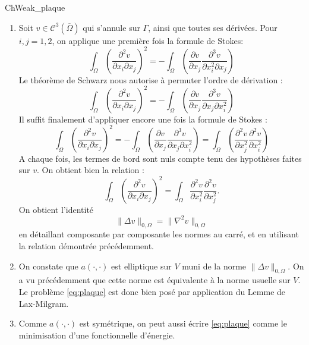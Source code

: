 \begin{corrige}{ChWeak_plaque}
\begin{enumerate}
\item Soit $v \in \mathcal{C}^3(\overline{\Omega})$ qui s'annule sur $\Gamma$, ainsi que toutes ses dérivées. Pour $i,j=1,2$, on applique une première fois la formule de Stokes:
\[
\int_\Omega \left (\frac{\partial^2 v}{\partial x_i \partial x_j} \right )^2
=
- \int_\Omega \left (\frac{\partial v}{\partial x_j} 
\frac{\partial^3 v}{\partial x^2_i \partial x_j}
\right )
\]
Le théorème de Schwarz nous autorise à permuter l'ordre de dérivation : 
\[
\int_\Omega \left (\frac{\partial^2 v}{\partial x_i \partial x_j} \right )^2
=
- \int_\Omega \left (\frac{\partial v}{\partial x_j} 
\frac{\partial^3 v}{ \partial x_j \partial x^2_i }
\right )
\]
Il suffit finalement d'appliquer encore une fois la formule de Stokes :
\[
\int_\Omega \left (\frac{\partial^2 v}{\partial x_i \partial x_j} \right )^2
=
- \int_\Omega \left (\frac{\partial v}{\partial x_j} 
\frac{\partial^3 v}{ \partial x_j \partial x^2_i }
\right )
=
\int_\Omega \left (\frac{\partial^2 v}{\partial x^2_j} 
\frac{\partial^2 v}{  \partial x^2_i }
\right ) 
\]
A chaque fois, les termes de bord sont nuls compte tenu des hypothèses faites sur $v$.
On obtient bien la relation :
\[
\int_\Omega \left (\frac{\partial^2 v}{\partial x_i \partial x_j} \right )^2
=
\int_\Omega \frac{\partial^2 v}{\partial x_i^2} \frac{\partial^2 v}{\partial x_j^2}.
\]
On obtient l'identité
\[
\| \Delta v \|_{0,\Omega} = \| \nabla^2 v \|_{0,\Omega}
\]
en détaillant composante par composante les normes au carré, et en utilisant la relation démontrée précédemment.

\item On constate que $a(\cdot,\cdot)$ est elliptique sur $V$ muni de la norme $\| \Delta v \|_{0,\Omega}$. On a vu précédemment que cette norme est équivalente à la norme usuelle sur $V$. Le problème \eqref{eq:plaque} est donc bien posé par application du Lemme de Lax-Milgram.

\item Comme $a(\cdot,\cdot)$ est symétrique, on peut aussi écrire \eqref{eq:plaque} comme le minimisation d'une fonctionnelle d'énergie.

\end{enumerate}

\end{corrige}

\newpage

